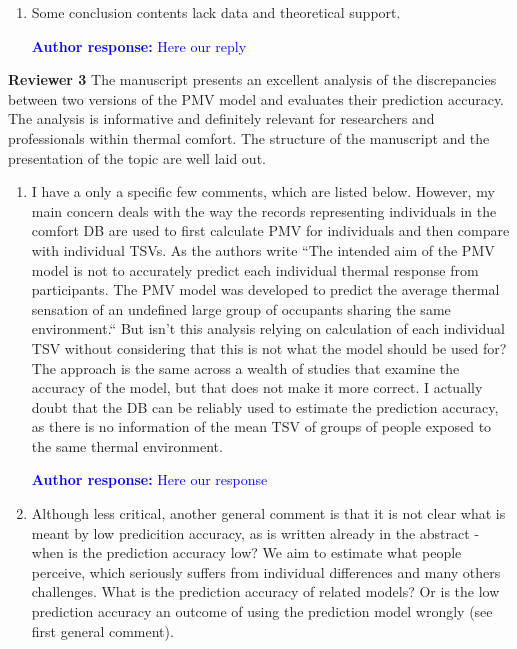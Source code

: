 \documentclass[a4paper, 10pt]{letter}
\newcommand{\response}[1]{\textcolor{blue}{\textbf{Author response:} #1}}
\begin{document}
\begin{letter}
\begin{enumerate}
            \item Some conclusion contents lack data and theoretical support.

            \response{Here our reply}

        \end{enumerate}

        \clearpage

        \textbf{Reviewer 3}
        The manuscript presents an excellent analysis of the discrepancies between two versions of the PMV model and evaluates their prediction accuracy.
        The analysis is informative and definitely relevant for researchers and professionals within thermal comfort.
        The structure of the manuscript and the presentation of the topic are well laid out.

        \begin{enumerate}
            \item I have a only a specific few comments, which are listed below.
            However, my main concern deals with the way the records representing individuals in the comfort DB are used to first calculate PMV for individuals and then compare with individual TSVs.
            As the authors write ``The intended aim of the PMV model is not to accurately predict each individual thermal response from participants.
            The PMV model was developed to predict the average thermal sensation of an undefined large group of occupants sharing the same environment.``
            But isn't this analysis relying on calculation of each individual TSV without considering that this is not what the model should be used for?
            The approach is the same across a wealth of studies that examine the accuracy of the model, but that does not make it more correct.
            I actually doubt that the DB can be reliably used to estimate the prediction accuracy, as there is no information of the mean TSV of groups of people exposed to the same thermal environment.

            \response{Here our response}

            \item Although less critical, another general comment is that it is not clear what is meant by low predicition accuracy, as is written already in the abstract - when is the prediction accuracy low?
            We aim to estimate what people perceive, which seriously suffers from individual differences and many others challenges.
            What is the prediction accuracy of related models?
            Or is the low prediction accuracy an outcome of using the prediction model wrongly (see first general comment).


\end{enumerate}
\end{letter}
\end{document}

